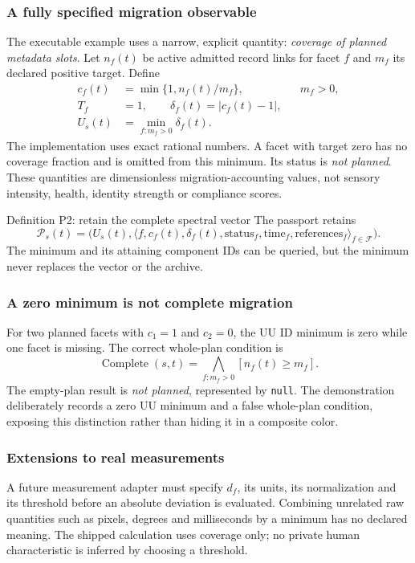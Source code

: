 \documentclass[11pt,a4paper]{article}
\begin{document}
\subsubsection{A fully specified migration observable}
The executable example uses a narrow, explicit quantity: \emph{coverage of planned metadata slots}. Let $n_f(t)$ be active admitted record links for facet $f$ and $m_f$ its declared positive target. Define
\begin{align}
 c_f(t)&=\min\{1,n_f(t)/m_f\},&&m_f>0,\\
 T_f&=1,\qquad\delta_f(t)=|c_f(t)-1|,\\
 U_s(t)&=\min_{f:m_f>0}\delta_f(t).
\end{align}
The implementation uses exact rational numbers. A facet with target zero has no coverage fraction and is omitted from this minimum. Its status is \emph{not planned}. These quantities are dimensionless migration-accounting values, not sensory intensity, health, identity strength or compliance scores.

\begin{formal}{Definition P2: retain the complete spectral vector}
The passport retains
\[
 \mathcal P_s(t)=\big(U_s(t),\langle f,c_f(t),\delta_f(t),\mathrm{status}_f,
   \mathrm{time}_f,\mathrm{references}_f\rangle_{f\in\mathcal F}\big).
\]
The minimum and its attaining component IDs can be queried, but the minimum never replaces the vector or the archive.
\end{formal}

\subsubsection{A zero minimum is not complete migration}
For two planned facets with $c_1=1$ and $c_2=0$, the UU ID minimum is zero while one facet is missing. The correct whole-plan condition is
\[
 \operatorname{Complete}(s,t)=\bigwedge_{f:m_f>0}[n_f(t)\ge m_f].
\]
The empty-plan result is \emph{not planned}, represented by \texttt{null}. The demonstration deliberately records a zero UU minimum and a false whole-plan condition, exposing this distinction rather than hiding it in a composite color.

\subsubsection{Extensions to real measurements}
A future measurement adapter must specify $d_f$, its units, its normalization and its threshold before an absolute deviation is evaluated. Combining unrelated raw quantities such as pixels, degrees and milliseconds by a minimum has no declared meaning. The shipped calculation uses coverage only; no private human characteristic is inferred by choosing a threshold.
\end{document}
